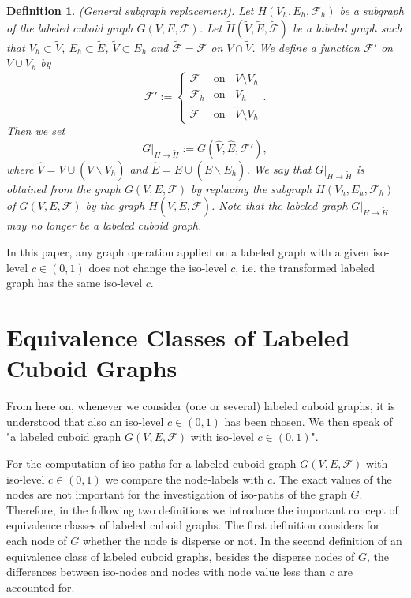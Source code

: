 \documentclass[a4paper,11pt]{article}
\newtheorem{definition}[theorem]{Definition}
\begin{document}
\begin{definition}(General subgraph replacement). Let $H(V_h,E_h,\mathcal{F}_h)$ be a subgraph of the labeled
cuboid graph $G(V,E,\mathcal{F})$. Let $\tilde{H}(\tilde{V},\tilde{E},\tilde{\mathcal{F}})$ be a labeled graph
such that $V_h\subset \tilde{V}$, $E_h\subset \tilde{E}$, $\tilde{V}\subset E_h$ and  $\tilde{\mathcal{F}}=\mathcal{F}$
on $V\cap \tilde{V}$. We define a function $\mathcal{F}'$ on $V\cup V_h$ by
\begin{equation}
\mathcal{F}':=\left\{
   \begin{array}{ll}
     \mathcal{F} & \mbox{on }\;\; V\setminus V_h \\
     \mathcal{F}_h & \mbox{on }\;\; V_h\\
     \tilde{\mathcal{F}} & \mbox{on }\;\; \tilde{V}\setminus V_h
   \end{array}\right..
\label{eq:labeled-graph-9}
\end{equation}
Then we set
\begin{equation}
G|_{H\rightarrow \tilde{H}}:=G(\hat{V},\hat{E},\mathcal{F}'),
\label{eq:labeled-graph-10}
\end{equation}
where $\hat{V}=V\cup (\tilde{V}\backslash V_h)$ and $\hat{E}=E\cup (\tilde{E}\backslash E_h)$.
We say that $G|_{H\rightarrow \tilde{H}}$ is obtained from the graph $G(V,E,\mathcal{F})$ by replacing
the subgraph $H(V_h,E_h,\mathcal{F}_h)$ of $G(V,E,\mathcal{F})$ by the graph
$\tilde{H}(\tilde{V},\tilde{E},\tilde{\mathcal{F}})$. Note that the labeled graph $G|_{H\rightarrow \tilde{H}}$
may no longer be a labeled cuboid graph.
\label{def:labeled-graph-4}
\end{definition}

In this paper, any graph operation applied on a labeled graph with a given iso-level $c\in (0,1)$
does not change the iso-level $c$, i.e. the transformed labeled graph has the same iso-level
$c$.

\section{Equivalence Classes of Labeled Cuboid Graphs}
From here on, whenever we consider (one or several) labeled cuboid graphs, it is understood that also
an iso-level $c\in (0,1)$ has been chosen. We then speak of "a labeled cuboid graph $G(V,E,\mathcal{F})$ with
iso-level $c\in (0,1)$".

For the computation of iso-paths for a labeled cuboid graph $G(V,E,\mathcal{F})$ with iso-level $c\in (0,1)$
we compare the node-labels with $c$. The exact values of the nodes are not important for the
investigation of iso-paths of the graph $G$. Therefore, in the following two definitions we introduce
the important concept of equivalence classes of labeled cuboid graphs. The first definition considers
for each node of $G$ whether the node is disperse or not. In the second definition of an equivalence
class of labeled cuboid graphs, besides the disperse nodes of $G$, the differences between iso-nodes
and nodes with node value less than $c$ are accounted for.
\end{document}
